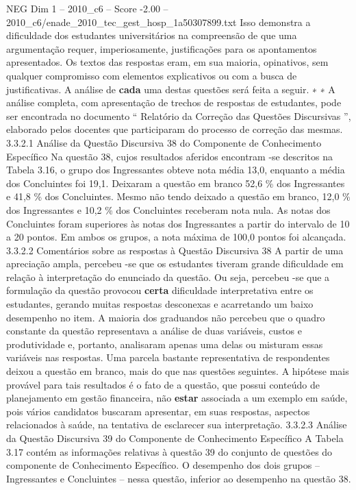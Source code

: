 \begin{textsample}{NEG Dim 1 – 2010\_c6 – Score -2.00 – 2010\_c6/enade\_2010\_tec\_gest\_hosp\_1a50307899.txt}
Isso demonstra a dificuldade dos estudantes universitários na compreensão de que uma argumentação requer, imperiosamente, justificações para os apontamentos apresentados.
Os textos das respostas eram, em sua maioria, opinativos, sem qualquer compromisso com elementos explicativos ou com a busca de justificativas.
A análise de \textbf{cada} uma destas questões será feita a seguir. ∗ ∗ A análise completa, com apresentação de trechos de respostas de estudantes, pode ser encontrada no documento “ Relatório da Correção das Questões Discursivas ”, elaborado pelos docentes que participaram do processo de correção das mesmas. 3.3.2.1 Análise da Questão Discursiva 38 do Componente de Conhecimento Específico Na questão 38, cujos resultados aferidos encontram -se descritos na Tabela 3.16, o grupo dos Ingressantes obteve nota média 13,0, enquanto a média dos Concluintes foi 19,1.
Deixaram a questão em branco 52,6 \% dos Ingressantes e 41,8 \% dos Concluintes.
Mesmo não tendo deixado a questão em branco, 12,0 \% dos Ingressantes e 10,2 \% dos Concluintes receberam nota nula.
As notas dos Concluintes foram superiores às notas dos Ingressantes a partir do intervalo de 10 a 20 pontos.
Em ambos os grupos, a nota máxima de 100,0 pontos foi alcançada. 3.3.2.2 Comentários sobre as respostas à Questão Discursiva 38 A partir de uma apreciação ampla, percebeu -se que os estudantes tiveram grande dificuldade em relação à interpretação do enunciado da questão.
Ou seja, percebeu -se que a formulação da questão provocou \textbf{certa} dificuldade interpretativa entre os estudantes, gerando muitas respostas desconexas e acarretando um baixo desempenho no item.
A maioria dos graduandos não percebeu que o quadro constante da questão representava a análise de duas variáveis, custos e produtividade e, portanto, analisaram apenas uma delas ou misturam essas variáveis nas respostas.
Uma parcela bastante representativa de respondentes deixou a questão em branco, mais do que nas questões seguintes.
A hipótese mais provável para tais resultados é o fato de a questão, que possui conteúdo de planejamento em gestão financeira, não \textbf{estar} associada a um exemplo em saúde, pois vários candidatos buscaram apresentar, em suas respostas, aspectos relacionados à saúde, na tentativa de esclarecer sua interpretação. 3.3.2.3 Análise da Questão Discursiva 39 do Componente de Conhecimento Específico A Tabela 3.17 contém as informações relativas à questão 39 do conjunto de questões do componente de Conhecimento Específico.
O desempenho dos dois grupos – Ingressantes e Concluintes – nessa questão, inferior ao desempenho na questão 38.

\end{textsample}
